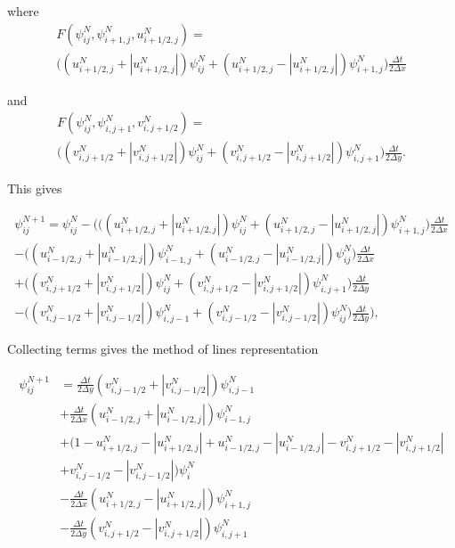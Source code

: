 \documentclass[12pt, a4paper]{article}
\newcommand{\abs}[1]{\left\lvert#1\right\rvert}
\begin{document}
where
\begin{multline}
F \left( \psi_{ij}^N,\psi_{i+1,j}^N,u_{i+1/2,j}^N\right) =\\
\Big( \left( u_{i+1/2,j}^N + \abs{u_{i+1/2,j}^N} \right) \psi_{ij}^N
+ \left( u_{i+1/2,j}^N - \abs{u_{i+1/2,j}^N} \right) \psi_{i+1,j}^N \Big)
\frac{\Delta t}{2 \Delta x}
\end{multline}

and
\begin{multline}
F \left( \psi_{ij}^N,\psi_{i,j+1}^N,v_{i,j+1/2}^N\right) =\\
\Big( \left( v_{i,j+1/2}^N + \abs{v_{i,j+1/2}^N} \right) \psi_{ij}^N
+ \left( v_{i,j+1/2}^N - \abs{v_{i,j+1/2}^N} \right) \psi_{i,j+1}^N \Big)
\frac{\Delta t}{2 \Delta y}.
\end{multline}

This gives

\begin{multline}
 \psi_{ij}^{N+1} = \psi_{ij}^N - \Big( \Big( \left( u_{i+1/2,j}^N + \abs{u_{i+1/2,j}^N} \right) \psi_{ij}^N
+ \left( u_{i+1/2,j}^N - \abs{u_{i+1/2,j}^N} \right) \psi_{i+1,j}^N \Big)
\frac{\Delta t}{2 \Delta x} \\
-\Big( \left( u_{i-1/2,j}^N + \abs{u_{i-1/2,j}^N} \right) \psi_{i-1,j}^N
+ \left( u_{i-1/2,j}^N - \abs{u_{i-1/2,j}^N} \right) \psi_{ij}^N \Big)
\frac{\Delta t}{2 \Delta x} \\
 + \Big( \left( v_{i,j+1/2}^N + \abs{v_{i,j+1/2}^N} \right) \psi_{ij}^N
+ \left( v_{i,j+1/2}^N - \abs{v_{i,j+1/2}^N} \right) \psi_{i,j+1}^N \Big)
\frac{\Delta t}{2 \Delta y} \\
 -\Big( \left( v_{i,j-1/2}^N + \abs{v_{i,j-1/2}^N} \right) \psi_{i,j-1}^N
+ \left( v_{i,j-1/2}^N - \abs{v_{i,j-1/2}^N} \right) \psi_{ij}^N \Big)
\frac{\Delta t}{2 \Delta y} \Big),
\end{multline}

Collecting terms gives the method of lines representation

\begin{equation}
\begin{split}
\psi_{ij}^{N+1} &=
\frac{\Delta t}{2 \Delta y} \left( v_{i,j-1/2}^N + \abs{v_{i,j-1/2}^N} \right) \psi_{i,j-1}^N\\
&+\frac{\Delta t}{2 \Delta x} \left( u_{i-1/2,j}^N + \abs{u_{i-1/2,j}^N} \right) \psi_{i-1,j}^N\\
&+ \Big(1 - u_{i+1/2,j}^N - \abs{u_{i+1/2,j}^N} + u_{i-1/2,j}^N - \abs{u_{i-1/2,j}^N} - v_{i,j+1/2}^N - \abs{v_{i,j+1/2}^N} \\
&+ v_{i,j-1/2}^N - \abs{v_{i,j-1/2}^N} \Big) \psi_i^N\\
&-\frac{\Delta t}{2 \Delta x} \left( u_{i+1/2,j}^N - \abs{u_{i+1/2,j}^N} \right) \psi_{i+1,j}^N\\
&-\frac{\Delta t}{2 \Delta y} \left( v_{i,j+1/2}^N - \abs{v_{i,j+1/2}^N} \right) \psi_{i,j+1}^N\\
\end{split}
\end{equation}
\end{document}
